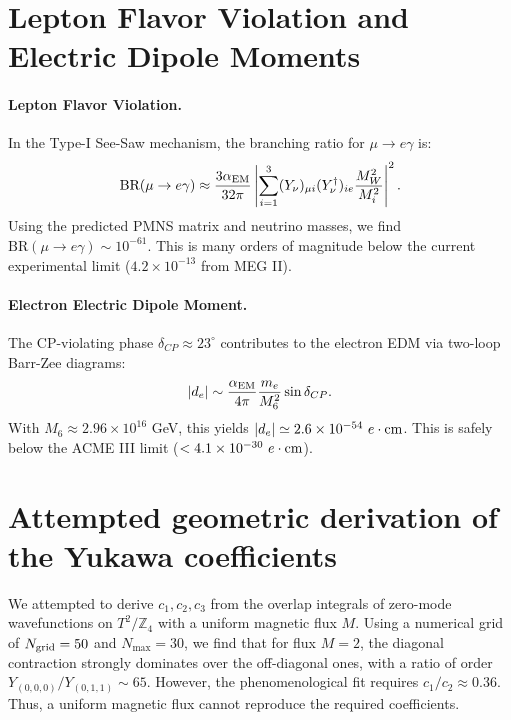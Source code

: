 \documentclass[12pt,a4paper]{article}
\numberwithin{equation}{section}
\begin{document}
\section{Lepton Flavor Violation and Electric Dipole Moments}
\label{sec:lfv_edm}
\paragraph{Lepton Flavor Violation.}
In the Type-I See-Saw mechanism, the branching ratio for \(\mu \to e \gamma\) is:
\begin{equation}
\text{BR}(\mu \to e \gamma) \approx \frac{3\alpha_{\rm EM}}{32\pi} \left| \sum_{i=1}^3 (Y_\nu)_{\mu i} (Y_\nu^\dagger)_{i e} \frac{M_W^2}{M_i^2} \right|^2.
\end{equation}
Using the predicted PMNS matrix and neutrino masses, we find $\text{BR}(\mu \to e \gamma) \sim 10^{-61}$. This is many orders of magnitude below the current experimental limit ($4.2 \times 10^{-13}$ from MEG II).

\paragraph{Electron Electric Dipole Moment.}
The CP-violating phase $\delta_{CP} \approx 23^\circ$ contributes to the electron EDM via two-loop Barr-Zee diagrams:
\begin{equation}
|d_e| \sim \frac{\alpha_{\rm EM}}{4\pi} \frac{m_e}{M_6^2} \sin\delta_{CP}.
\end{equation}
With \(M_6 \approx 2.96 \times 10^{16}\) GeV, this yields \(|d_e| \simeq 2.6 \times 10^{-54}~e\cdot{\rm cm}\). This is safely below the ACME III limit (\(< 4.1 \times 10^{-30}~e\cdot{\rm cm}\)).

\section{Attempted geometric derivation of the Yukawa coefficients}
\label{sec:negative_flux}
We attempted to derive \(c_1, c_2, c_3\) from the overlap integrals of zero-mode wavefunctions on \(T^2/\mathbb{Z}_4\) with a uniform magnetic flux \(M\).
Using a numerical grid of \(N_{\rm grid} = 50\) and \(N_{\max} = 30\), we find that for flux \(M=2\), the diagonal contraction strongly dominates over the off-diagonal ones, with a ratio of order \(Y_{(0,0,0)}/Y_{(0,1,1)} \sim 65\). However, the phenomenological fit requires \(c_1/c_2 \approx 0.36\). Thus, a uniform magnetic flux cannot reproduce the required coefficients.
\end{document}
